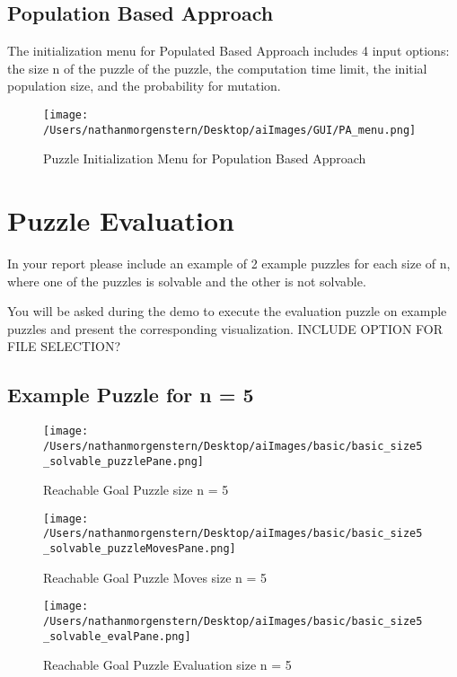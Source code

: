 \documentclass{report}
\begin{document}
\newpage	
\subsection{Population Based Approach}
The initialization menu for Populated Based Approach includes 4 input options: the size n of the puzzle of the puzzle, the computation time limit, the initial population size, and the probability for mutation.

	\begin{figure}[H]
	\centering
	\texttt{[image: /Users/nathanmorgenstern/Desktop/aiImages/GUI/PA\_menu.png]}
	\caption{Puzzle Initialization Menu for Population Based Approach}
	\label{fig: Puzzle Initialization Menu for Population Based Approach}
	\end{figure}

\newpage
\section{Puzzle Evaluation}

In your report please include an example of 2 example puzzles for each size of n, where
one of the puzzles is solvable and the other is not solvable.

You will be asked during the demo to execute the evaluation puzzle on example puzzles and present the 
corresponding visualization. INCLUDE OPTION FOR FILE SELECTION?


\subsection{Example Puzzle for n = 5}

	\begin{figure}[H]
	\centering
	\texttt{[image: /Users/nathanmorgenstern/Desktop/aiImages/basic/basic\_size5\_solvable\_puzzlePane.png]}
	\caption{Reachable Goal Puzzle size n = 5}
	\label{fig: Basic Evaluation n = 5 reachable goal puzzle }
	\end{figure}
	
	\begin{figure}[H]
	\centering
	\texttt{[image: /Users/nathanmorgenstern/Desktop/aiImages/basic/basic\_size5\_solvable\_puzzleMovesPane.png]}
	\caption{Reachable Goal Puzzle Moves size n = 5}
	\label{fig: Basic Evaluation n = 5 reachable goal puzzle moves}
	\end{figure}
	
	\begin{figure}[H]
	\centering
	\texttt{[image: /Users/nathanmorgenstern/Desktop/aiImages/basic/basic\_size5\_solvable\_evalPane.png]}
	\caption{Reachable Goal Puzzle Evaluation size n = 5}
	\label{fig: Basic Evaluation n = 5 reachable goal puzzle evaluation}
	\end{figure}
	
\end{document}
